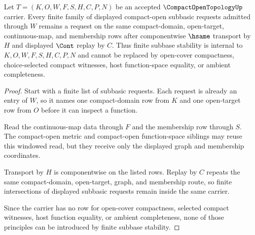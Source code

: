 \begin{theorem}
\label{thm:compact-open-topology-finite-subbase-stability}
Let $T=(K,O,W,F,S,H,C,P,N)$ be an accepted $\CompactOpenTopologyUp$ carrier. Every finite family of displayed compact-open subbasic requests admitted through $W$ remains a request on the same compact-domain, open-target, continuous-map, and membership rows after componentwise $\hsame$ transport by $H$ and displayed $\Cont$ replay by $C$. Thus finite subbase stability is internal to $K,O,W,F,S,H,C,P,N$ and cannot be replaced by open-cover compactness, choice-selected compact witnesses, host function-space equality, or ambient completeness.
\end{theorem}
\begin{proof}
Start with a finite list of subbasic requests. Each request is already an entry of $W$, so it names one compact-domain row from $K$ and one open-target row from $O$ before it can inspect a function.

Read the continuous-map data through $F$ and the membership row through $S$. The compact-open metric and compact-open function-space siblings may reuse this windowed read, but they receive only the displayed graph and membership coordinates.

Transport by $H$ is componentwise on the listed rows. Replay by $C$ repeats the same compact-domain, open-target, graph, and membership route, so finite intersections of displayed subbasic requests remain inside the same carrier.

Since the carrier has no row for open-cover compactness, selected compact witnesses, host function equality, or ambient completeness, none of those principles can be introduced by finite subbase stability.
\end{proof}

\begin{closurestatus}{\CompactOpenTopologyUp}
  \theoryclosure{\seedClosure}
  \formalstatus{\theoremCheckedV}
\end{closurestatus}
